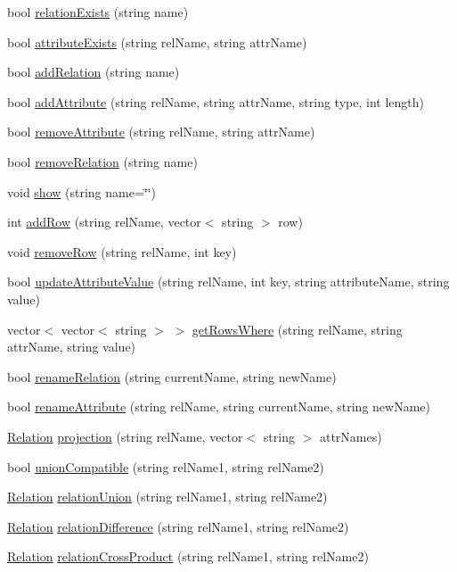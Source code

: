 \begin{DoxyCompactItemize}
\item 
bool \hyperlink{class_database_ac1435d217402f4667dd3c62e2c3456d1}{relation\-Exists} (string name)
\item 
bool \hyperlink{class_database_a8553be991d9615cd04aa96f117363537}{attribute\-Exists} (string rel\-Name, string attr\-Name)
\item 
bool \hyperlink{class_database_ae1a928caf223e2cbe1a3a78140773e88}{add\-Relation} (string name)
\item 
bool \hyperlink{class_database_ab53f2a8af55fd5ff8daa92eaf4f2c55f}{add\-Attribute} (string rel\-Name, string attr\-Name, string type, int length)
\item 
bool \hyperlink{class_database_af7bed4fd63c5374cb1fd97f0e9f72b96}{remove\-Attribute} (string rel\-Name, string attr\-Name)
\item 
bool \hyperlink{class_database_abc38a65c8593339c450f918ebe5d48c1}{remove\-Relation} (string name)
\item 
void \hyperlink{class_database_a959909a78516b1a6a73ccea7968c70e7}{show} (string name=\char`\"{}\char`\"{})
\item 
int \hyperlink{class_database_ac73ed9280bd5c4f685cdd89ef7e2cd3e}{add\-Row} (string rel\-Name, vector$<$ string $>$ row)
\item 
void \hyperlink{class_database_aa8324ade169386cde3f1c0a212e186f9}{remove\-Row} (string rel\-Name, int key)
\item 
bool \hyperlink{class_database_a61173497b8a9b6f1701fabfaa920954c}{update\-Attribute\-Value} (string rel\-Name, int key, string attribute\-Name, string value)
\item 
vector$<$ vector$<$ string $>$ $>$ \hyperlink{class_database_acfe8e5676779ee61013a47d34ef0e39c}{get\-Rows\-Where} (string rel\-Name, string attr\-Name, string value)
\item 
bool \hyperlink{class_database_af9213d1ecf9a4ec08d67e3f2bd565f2f}{rename\-Relation} (string current\-Name, string new\-Name)
\item 
bool \hyperlink{class_database_a1f9663265995e751bf461d1b9e60ebfd}{rename\-Attribute} (string rel\-Name, string current\-Name, string new\-Name)
\item 
\hyperlink{class_relation}{Relation} \hyperlink{class_database_af113b1e566197ff5231c7b792a6a4d98}{projection} (string rel\-Name, vector$<$ string $>$ attr\-Names)
\item 
bool \hyperlink{class_database_a9e61f5f7d4ac2b56ff768c908acec026}{union\-Compatible} (string rel\-Name1, string rel\-Name2)
\item 
\hyperlink{class_relation}{Relation} \hyperlink{class_database_a1fa5ff90a41f1231c58b841a9d3e0475}{relation\-Union} (string rel\-Name1, string rel\-Name2)
\item 
\hyperlink{class_relation}{Relation} \hyperlink{class_database_a8799dbd5a15a2e43c74bc4543fe8fa2e}{relation\-Difference} (string rel\-Name1, string rel\-Name2)
\item 
\hyperlink{class_relation}{Relation} \hyperlink{class_database_adabfc3cb1f51932ff08007200b0972a8}{relation\-Cross\-Product} (string rel\-Name1, string rel\-Name2)
\end{DoxyCompactItemize}
